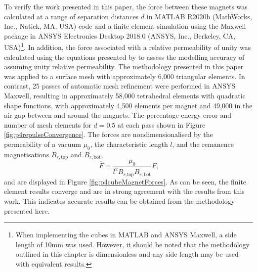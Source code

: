 To verify the work presented in this paper, the force between these magnets was calculated at a range of separation distances \(d\) in MATLAB R2020b (MathWorks, Inc., Natick, MA, USA) code and a finite element simulation using the Maxwell package in ANSYS Electronics Desktop 2018.0 (ANSYS, Inc., Berkeley, CA, USA)\footnote{When implementing the cubes in MATLAB and ANSYS Maxwell, a side length of 10mm was used. However, it should be noted that the methodology outlined in this chapter is dimensionless and any side length may be used with equivalent results.}. In addition, the force associated with a relative permeability of unity was calculated using the equations presented by \textcite{Akoun1984} to assess the modelling accuracy of assuming unity relative permeability. The methodology presented in this paper was applied to a surface mesh with approximately 6,000 triangular elements. In contrast, 25 passes of automatic mesh refinement were performed in ANSYS Maxwell, resulting in approximately 58,000 tetrahedral elements with quadratic shape functions, with approximately 4,500 elements per magnet and 49,000 in the air gap between and around the magnets. The percentage energy error and number of mesh elements for \(d = 0.5\) at each pass shown in Figure \ref{fig:p4repulseConvergence}. The forces are nondimensionalised by the permeability of a vacuum \(\mu_0\), the characteristic length \(l\), and the remanence magnetisations \(B_{r,\text{top}}\) and \(B_{r,\text{bot}}\),
\begin{equation}\label{eqn:p4forceNormalisation}
	\hat{F} = \frac{\mu_0}{l^2 B_{r\text{,top}} B_{r,\text{bot}}} F \text{,}
\end{equation}
and are displayed in Figure \ref{fig:p4cubeMagnetForces}. As can be seen, the finite element results converge and are in strong agreement with the results from this work. This indicates accurate results can be obtained from the methodology presented here.

